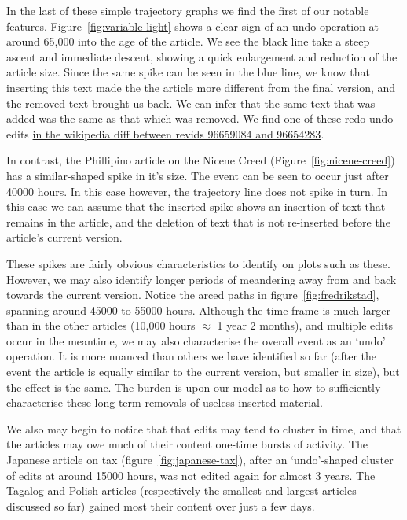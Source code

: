 In the last of these simple trajectory graphs we find the first of our
notable features. Figure~\ref{fig:variable-light} shows a clear sign
of an undo operation at around 65,000 into the age of the article. We
see the black line take a steep ascent and immediate descent, showing
a quick enlargement and reduction of the article size. Since the same
spike can be seen in the blue line, we know that inserting this text
made the the article more different from the final version, and the
removed text brought us back. We can infer that the same text that was
added was the same as that which was removed. We find one of these
redo-undo edits
\href{http://fr.wikipedia.org/w/index.php?title=Th\%C3\%A9ories\_d\%27une\_vitesse\_de\_lumi\%C3\%A8re\_variable&diff=96659084&oldid=96654283}{in
  the wikipedia diff between revids 96659084 and 96654283}.

In contrast, the Phillipino article on the Nicene Creed
(Figure~\ref{fig:nicene-creed}) has a similar-shaped spike in it's
size. The event can be seen to occur just after 40000 hours. In this
case however, the trajectory line does not spike in turn. In this case
we can assume that the inserted spike shows an insertion of text that
remains in the article, and the deletion of text that is not
re-inserted before the article's current version.

These spikes are fairly obvious characteristics to identify on plots
such as these. However, we may also identify longer periods of
meandering away from and back towards the current version. Notice the
arced paths in figure~\ref{fig:fredrikstad}, spanning around 45000 to
55000 hours. Although the time frame is much larger than in the other
articles (10,000 hours $\approx$ 1 year 2 months), and multiple edits
occur in the meantime, we may also characterise the overall event as
an `undo' operation. It is more nuanced than others we have identified
so far (after the event the article is equally similar to the current
version, but smaller in size), but the effect is the same. The burden
is upon our model as to how to sufficiently characterise these
long-term removals of useless inserted material.

We also may begin to notice that that edits may tend to cluster in
time, and that the articles may owe much of their content one-time
bursts of activity. The Japanese article on tax
(figure~\ref{fig:japanese-tax}), after an `undo'-shaped cluster of
edits at around 15000 hours, was not edited again for almost 3
years. The Tagalog and Polish articles (respectively the smallest and
largest articles discussed so far) gained most their content over just
a few days. 


